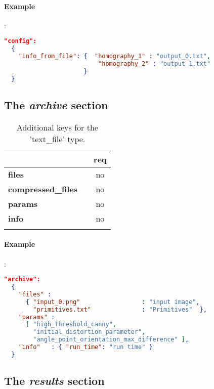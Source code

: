 \paragraph{Example}:\\
\begin{lstlisting}[language=json,firstnumber=1]
"config":
  {
    "info_from_file": {  "homography_1" : "output_0.txt",
                          "homography_2" : "output_1.txt"
                      }
  }
\end{lstlisting}

\subsection{The \emph{archive} section}

\begin{longtable}{|>{\bf}L{\linewidth}|L{\linewidth}|c|}
\hline
{}     &  & {\bf req} \tabularnewline 
\hline \hline
 files    &  & no \\ \hline
 compres\-sed\_\-files   &  & no \\ \hline
 params &  & no \\ \hline
 info    & & no \\ \hline
\caption{Additional keys for the 'text\_file' type.}
\end{longtable}


\paragraph{Example}:\\
\begin{lstlisting}[language=json,firstnumber=1]
"archive":
  {
    "files" : 
      { "input_0.png"                 : "input image",
        "primitives.txt"              : "Primitives"  },
    "params" :  
      [ "high_threshold_canny", 
        "initial_distortion_parameter", 
        "angle_point_orientation_max_difference" ],
    "info"   : { "run_time": "run time" }
  }
\end{lstlisting}

\subsection{The \emph{results} section}


